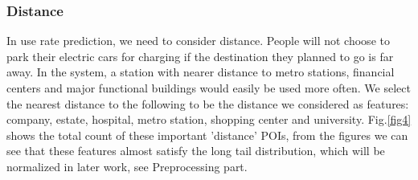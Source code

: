 \documentclass[runningheads]{llncs}
\begin{document}
\subsubsection{Distance}

In use rate prediction, we need to consider distance. People will not choose to park their electric cars for charging if the destination they planned to go is far away. In the system, a station with nearer distance to metro stations, financial centers and major functional buildings would easily be used more often. We select the nearest distance to the following to be the distance we considered as features: company, estate, hospital, metro station, shopping center and university. Fig.\ref{fig4} shows the total count of these important 'distance' POIs, from the figures we can see that these features almost satisfy the long tail distribution, which will be normalized in later work, see Preprocessing part.
\end{document}
